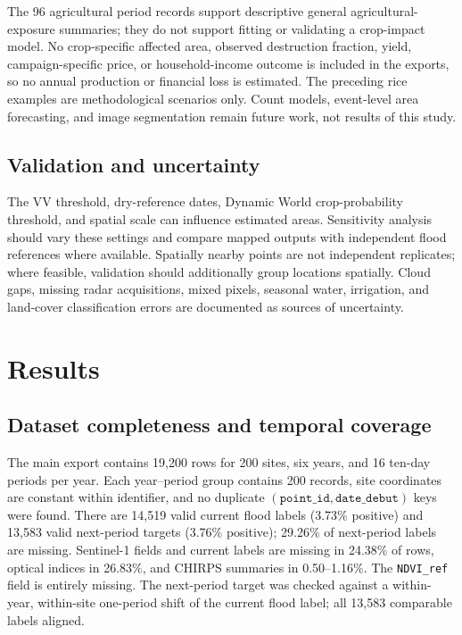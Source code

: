 \documentclass[pdflatex,sn-mathphys,Numbered]{sn-jnl}
\begin{document}
The 96 agricultural period records support descriptive general agricultural-exposure summaries; they do not support fitting or validating a crop-impact model. No crop-specific affected area, observed destruction fraction, yield, campaign-specific price, or household-income outcome is included in the exports, so no annual production or financial loss is estimated. The preceding rice examples are methodological scenarios only. Count models, event-level area forecasting, and image segmentation remain future work, not results of this study.

\subsection{Validation and uncertainty}
The VV threshold, dry-reference dates, Dynamic World crop-probability threshold, and spatial scale can influence estimated areas. Sensitivity analysis should vary these settings and compare mapped outputs with independent flood references where available. Spatially nearby points are not independent replicates; where feasible, validation should additionally group locations spatially. Cloud gaps, missing radar acquisitions, mixed pixels, seasonal water, irrigation, and land-cover classification errors are documented as sources of uncertainty.

\section{Results}
\subsection{Dataset completeness and temporal coverage}
The main export contains 19,200 rows for 200 sites, six years, and 16 ten-day periods per year. Each year--period group contains 200 records, site coordinates are constant within identifier, and no duplicate $(\texttt{point\_id},\texttt{date\_debut})$ keys were found. There are 14,519 valid current flood labels (3.73\% positive) and 13,583 valid next-period targets (3.76\% positive); 29.26\% of next-period labels are missing. Sentinel-1 fields and current labels are missing in 24.38\% of rows, optical indices in 26.83\%, and CHIRPS summaries in 0.50--1.16\%. The \texttt{NDVI\_ref} field is entirely missing. The next-period target was checked against a within-year, within-site one-period shift of the current flood label; all 13,583 comparable labels aligned.
\end{document}
